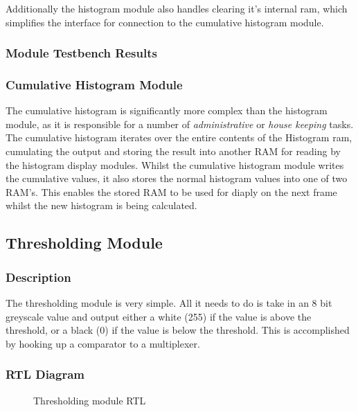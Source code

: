 \documentclass[12pt]{article}
\begin{document}
  Additionally the histogram module also handles clearing it's internal ram, which simplifies the interface for connection to the cumulative histogram module.
  
  \subsubsection{Module Testbench Results}
  
  \subsubsection{Cumulative Histogram Module}
  The cumulative histogram is significantly more complex than the histogram module, as it is responsible for a number of \textit{administrative} or \textit{house keeping} tasks. The cumulative histogram iterates over the entire contents of the Histogram ram, cumulating the output and storing the result into another RAM for reading by the histogram display modules. Whilst the cumulative histogram module writes the cumulative values, it also stores the normal histogram values into one of two RAM's. This enables the stored RAM to be used for diaply on the next frame whilst the new histogram is being calculated.

  \subsection{Thresholding Module}
  \subsubsection{Description}
  The thresholding module is very simple. All it needs to do is take in an 8 bit greyscale value and output either a white (255) if the value is above the threshold, or a black (0) if the value is below the threshold. This is accomplished by hooking up a comparator to a multiplexer.
  
  \subsubsection{RTL Diagram}
  \begin{figure}[H]
    \caption{Thresholding module RTL}
    \label{fig:thresholder_rtl}
  \end{figure}
  
\end{document}
